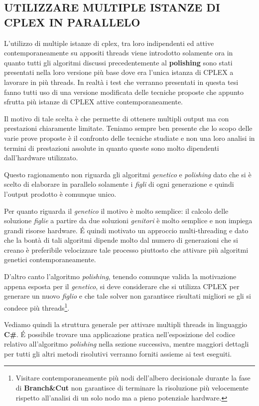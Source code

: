\documentclass[11pt]{article}
\begin{document}
\subsection*{UTILIZZARE MULTIPLE ISTANZE DI CPLEX IN PARALLELO}
\label{sec:ParCPLEXS}

L'utilizzo di multiple istanze di cplex, tra loro indipendenti ed attive contemporaneamente su appositi threads viene introdotto solamente ora in quanto tutti gli algoritmi discussi precedentemente al \textbf{polishing} sono stati presentati nella loro versione più base dove era l'unica istanza di CPLEX a lavorare in più threads. In realtà i test che verranno presentati in questa tesi fanno tutti uso di una versione modificata delle tecniche proposte che appunto sfrutta più istanze di CPLEX attive contemporaneamente.

Il motivo di tale scelta è che permette di ottenere multipli output ma con prestazioni chiaramente limitate. Teniamo sempre ben presente che lo scopo delle varie prove proposte è il confronto delle tecniche studiate e non una loro analisi in termini di prestazioni assolute in quanto queste sono molto dipendenti dall'hardware utilizzato.

Questo ragionamento non riguarda gli algoritmi \textit{genetico} e \textit{polishing} dato che si è scelto di elaborare in parallelo solamente i \textit{figli} di ogni generazione e quindi l'output prodotto è comunque unico.

Per quanto riguarda il \textit{genetico} il motivo è molto semplice: il calcolo delle soluzione \textit{figlie} a partire da due soluzioni \textit{genitori} è molto semplice e non impiega grandi risorse hardware. \'E quindi motivato un approccio multi-threading e dato che la bontà di tali algoritmi dipende molto dal numero di generazioni che si creano è preferibile velocizzare tale processo piuttosto che attivare più algoritmi genetici contemporaneamente.

D'altro canto l'algoritmo \textit{polishing}, tenendo comunque valida la motivazione appena esposta per il \textit{genetico}, si deve considerare che si utilizza CPLEX per generare un nuovo \textit{figlio} e che tale solver non garantisce risultati migliori se gli si condece più threads\footnote{Visitare contemporaneamente più nodi dell'albero decisionale durante la fase di \textbf{Branch\&Cut} non garantisce di terminare la risoluzione più velocemente rispetto all'analisi di un solo nodo ma a pieno potenziale hardware.}.

Vediamo quindi la struttura generale per attivare multipli threads in linguaggio \textbf{C\#}. \'E possibile trovare una applicazione pratica nell'esposizione del codice relativo all'algoritmo \textit{polishing} nella sezione successiva, mentre maggiori dettagli per tutti gli altri metodi risolutivi verranno forniti assieme ai test eseguiti.
\end{document}
